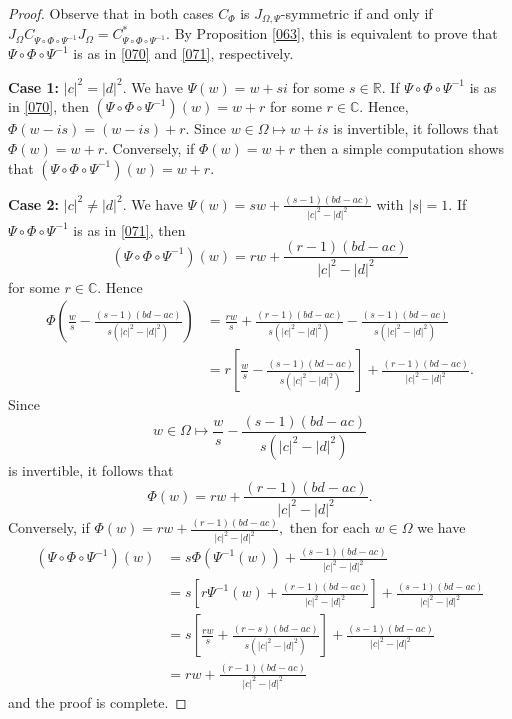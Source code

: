\documentclass[11pt]{amsart}%
\theoremstyle{definition}
\theoremstyle{remark}
\numberwithin{equation}{section}
\begin{document}
\begin{proof}
Observe that in both cases $C_{\Phi}$ is $J_{\Omega,\Psi}$-symmetric if and
only if $J_{\Omega}C_{\Psi\circ\Phi\circ\Psi^{-1}}J_{\Omega}=C_{\Psi\circ
\Phi\circ\Psi^{-1}}^{*}.$ By Proposition \ref{063}, this is equivalent to
prove that $\Psi\circ\Phi\circ\Psi^{-1}$ is as in \eqref{070} and \eqref{071}, respectively.

\textbf{Case 1:} $|c|^{2}=|d|^{2}.$ \newline We have $\Psi(w)=w+si$ for some
$s\in\mathbb{R}.$ If $\Psi\circ\Phi\circ\Psi^{-1}$ is as in \eqref{070}, then
$(\Psi\circ\Phi\circ\Psi^{-1})(w)=w+r$ for some $r\in\mathbb{C}.$ Hence,
$\Phi(w-is)=(w-is)+r.$ Since $w\in\Omega\mapsto w+is$ is invertible, it
follows that $\Phi(w)=w+r.$ Conversely, if $\Phi(w)=w+r$ then a simple
computation shows that $(\Psi\circ\Phi\circ\Psi^{-1})(w)=w+r.$

\textbf{Case 2:} $|c|^{2}\neq|d|^{2}.$ \newline We have $\Psi(w)=sw+\frac
{(s-1)(bd-ac)}{|c|^{2}-|d|^{2}}$ with $|s|=1.$ If $\Psi\circ\Phi\circ\Psi
^{-1}$ is as in \eqref{071}, then
\[
(\Psi\circ\Phi\circ\Psi^{-1})(w)=rw+\frac{(r-1)(bd-ac)}{|c|^{2}-|d|^{2}}%
\]
for some $r\in\mathbb{C}.$ Hence
\begin{align*}
\Phi\left(  \frac{w}{s}-\frac{(s-1)(bd-ac)}{s(|c|^{2}-|d|^{2})}\right)   &
=\frac{rw}{s}+\frac{(r-1)(bd-ac)}{s(|c|^{2}-|d|^{2})}-\frac{(s-1)(bd-ac)}%
{s(|c|^{2}-|d|^{2})}\\
&  =r\left[  \frac{w}{s}-\frac{(s-1)(bd-ac)}{s(|c|^{2}-|d|^{2})}\right]
+\frac{(r-1)(bd-ac)}{|c|^{2}-|d|^{2}}.
\end{align*}
Since
\[
w\in\Omega\mapsto\frac{w}{s}-\frac{(s-1)(bd-ac)}{s(|c|^{2}-|d|^{2})}%
\]
is invertible, it follows that
\[
\Phi(w)=rw+\frac{(r-1)(bd-ac)}{|c|^{2}-|d|^{2}}.
\]
Conversely, if $\Phi(w)=rw+\frac{(r-1)(bd-ac)}{|c|^{2}-|d|^{2}},$ then for
each $w\in\Omega$ we have
\begin{align*}
(\Psi\circ\Phi\circ\Psi^{-1})(w)  &  =s\Phi(\Psi^{-1}(w))+\frac{(s-1)(bd-ac)}%
{|c|^{2}-|d|^{2}}\\
&  =s\left[  r\Psi^{-1}(w)+\frac{(r-1)(bd-ac)}{|c|^{2}-|d|^{2}}\right]
+\frac{(s-1)(bd-ac)}{|c|^{2}-|d|^{2}}\\
&  =s\left[  \frac{rw}{s}+\frac{(r-s)(bd-ac)}{s(|c|^{2}-|d|^{2})}\right]
+\frac{(s-1)(bd-ac)}{|c|^{2}-|d|^{2}}\\
&  =rw+\frac{(r-1)(bd-ac)}{|c|^{2}-|d|^{2}}
\end{align*}
and the proof is complete.
\end{proof}
\end{document}
